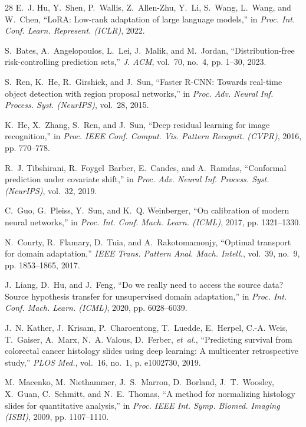 \documentclass[journal]{IEEEtran}
\begin{document}
\begin{thebibliography}{28}
E.~J. Hu, Y.~Shen, P.~Wallis, Z.~Allen-Zhu, Y.~Li, S.~Wang, L.~Wang, and W.~Chen, ``{LoRA}: Low-rank adaptation of large language models,'' in \emph{Proc. Int. Conf. Learn. Represent. (ICLR)}, 2022.

S.~Bates, A.~Angelopoulos, L.~Lei, J.~Malik, and M.~Jordan, ``Distribution-free risk-controlling prediction sets,'' \emph{J. ACM}, vol.~70, no.~4, pp. 1--30, 2023.

S.~Ren, K.~He, R.~Girshick, and J.~Sun, ``Faster {R-CNN}: Towards real-time object detection with region proposal networks,'' in \emph{Proc. Adv. Neural Inf. Process. Syst. (NeurIPS)}, vol.~28, 2015.

K.~He, X.~Zhang, S.~Ren, and J.~Sun, ``Deep residual learning for image recognition,'' in \emph{Proc. IEEE Conf. Comput. Vis. Pattern Recognit. (CVPR)}, 2016, pp. 770--778.

R.~J. Tibshirani, R.~Foygel~Barber, E.~Candes, and A.~Ramdas, ``Conformal prediction under covariate shift,'' in \emph{Proc. Adv. Neural Inf. Process. Syst. (NeurIPS)}, vol.~32, 2019.

C.~Guo, G.~Pleiss, Y.~Sun, and K.~Q. Weinberger, ``On calibration of modern neural networks,'' in \emph{Proc. Int. Conf. Mach. Learn. (ICML)}, 2017, pp. 1321--1330.

N.~Courty, R.~Flamary, D.~Tuia, and A.~Rakotomamonjy, ``Optimal transport for domain adaptation,'' \emph{IEEE Trans. Pattern Anal. Mach. Intell.}, vol.~39, no.~9, pp. 1853--1865, 2017.

J.~Liang, D.~Hu, and J.~Feng, ``Do we really need to access the source data? Source hypothesis transfer for unsupervised domain adaptation,'' in \emph{Proc. Int. Conf. Mach. Learn. (ICML)}, 2020, pp. 6028--6039.

J.~N. Kather, J.~Krisam, P.~Charoentong, T.~Luedde, E.~Herpel, C.-A. Weis, T.~Gaiser, A.~Marx, N.~A. Valous, D.~Ferber, \emph{et~al.}, ``Predicting survival from colorectal cancer histology slides using deep learning: A multicenter retrospective study,'' \emph{PLOS Med.}, vol.~16, no.~1, p. e1002730, 2019.

M.~Macenko, M.~Niethammer, J.~S.~Marron, D.~Borland, J.~T.~Woosley, X.~Guan, C.~Schmitt, and N.~E.~Thomas, ``A method for normalizing histology slides for quantitative analysis,'' in \emph{Proc. IEEE Int. Symp. Biomed. Imaging (ISBI)}, 2009, pp. 1107--1110.


\end{thebibliography}
\end{document}
